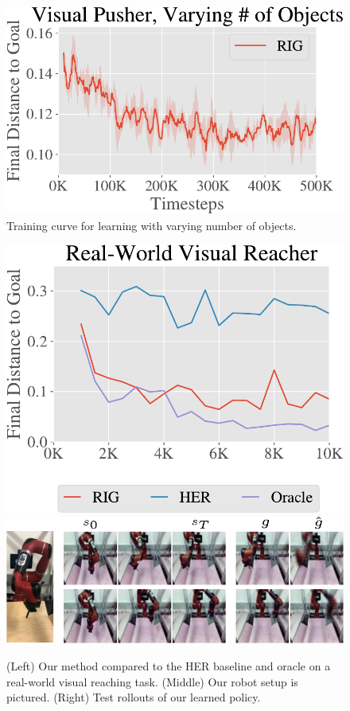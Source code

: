 \documentclass{article}
\begin{document}
\begin{figure}
    \centering
    \vspace{-0.2in}
    \includegraphics[width=\linewidth]{img/pusher_vary_multiobject.pdf}
    \vspace{-0.1in}
    \caption{Training curve for learning with varying number of objects.}
    \vspace{-0.2in}
    \label{fig:multiobject}
\end{figure}

\begin{figure}
    \centering
    \includegraphics[width=0.285\linewidth]{img/real_reacher.pdf}
    \includegraphics[width=0.6\linewidth]{img/real_rollouts-crop.pdf}
    \caption{(Left) Our method compared to the HER baseline and oracle on a real-world visual reaching task. (Middle) Our robot setup is pictured. (Right) Test rollouts of our learned policy. }
    \vspace{-0.2in}
    \label{fig:realworld-robot-results}
\end{figure}

\vspace{-0.1in}
\end{document}
